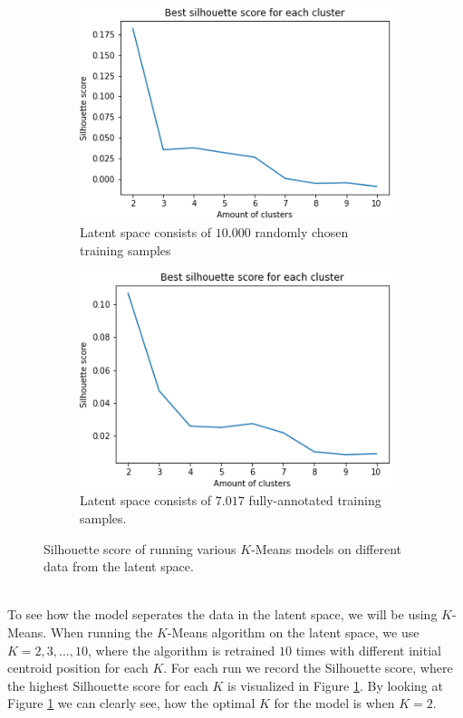 \documentclass[./main.tex]{subfiles}
\begin{document}
\begin{figure}[htbp]
    \centering
    \begin{subfigure}{7 cm}
        \centering
        \includegraphics[width = 7 cm]{entities/silhouette_score_all_skeletons.png}
        \caption{Latent space consists of $10.000$ randomly chosen training samples}
        \label{fig:silhouette_all}
    \end{subfigure}
    \begin{subfigure}{7 cm}
        \centering
        \includegraphics[width = 7 cm]{entities/silhouette_score_full_skeletons.png}
        \caption{Latent space consists of $7.017$ fully-annotated training samples.}
        \label{fig:silhouette_full}
    \end{subfigure}
    \caption{Silhouette score of running various $K$-Means models on different data from the latent space.}
\end{figure}
\\
To see how the model seperates the data in the latent space, we will be using $K$-Means. When running the $K$-Means algorithm on the latent space, we use $K = 2, 3, ..., 10$, where the algorithm is retrained $10$ times with different initial centroid position for each $K$. For each run we record the Silhouette score, where the highest Silhouette score for each $K$ is visualized in Figure \ref{fig:silhouette_all}. By looking at Figure \ref{fig:silhouette_all} we can clearly see, how the optimal $K$ for the model is when $K = 2$.
\\
\end{document}
